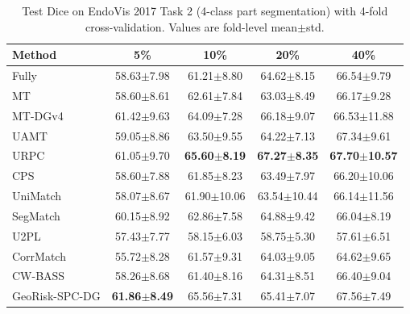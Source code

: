 \documentclass[journal]{IEEEtran}
\begin{document}
\begin{table}[t]
\caption{Test Dice on EndoVis 2017 Task 2 (4-class part segmentation) with 4-fold cross-validation. Values are fold-level mean$\pm$std.}
\label{tab:task2_results}
\centering
\scriptsize
\begin{tabular}{lcccc}
\toprule
Method & 5\% & 10\% & 20\% & 40\% \\
\midrule
Fully & 58.63{\tiny$\pm$7.98} & 61.21{\tiny$\pm$8.80} & 64.62{\tiny$\pm$8.15} & 66.54{\tiny$\pm$9.79} \\
MT \cite{tarvainen2017mean} & 58.60{\tiny$\pm$8.61} & 62.61{\tiny$\pm$7.84} & 63.03{\tiny$\pm$8.49} & 66.17{\tiny$\pm$9.28} \\
MT-DGv4 & 61.42{\tiny$\pm$9.63} & 64.09{\tiny$\pm$7.28} & 66.18{\tiny$\pm$9.07} & 66.53{\tiny$\pm$11.88} \\
UAMT \cite{yu2019uncertainty} & 59.05{\tiny$\pm$8.86} & 63.50{\tiny$\pm$9.55} & 64.22{\tiny$\pm$7.13} & 67.34{\tiny$\pm$9.61} \\
URPC \cite{chen2021urpc} & 61.05{\tiny$\pm$9.70} & \textbf{65.60{\tiny$\pm$8.19}} & \textbf{67.27{\tiny$\pm$8.35}} & \textbf{67.70{\tiny$\pm$10.57}} \\
CPS \cite{chen2021cps} & 58.60{\tiny$\pm$7.88} & 61.85{\tiny$\pm$8.23} & 63.49{\tiny$\pm$7.97} & 66.20{\tiny$\pm$10.06} \\
UniMatch \cite{yang2023unimatch} & 58.07{\tiny$\pm$8.67} & 61.90{\tiny$\pm$10.06} & 63.54{\tiny$\pm$10.44} & 66.14{\tiny$\pm$11.56} \\
SegMatch \cite{segmatch2025} & 60.15{\tiny$\pm$8.92} & 62.86{\tiny$\pm$7.58} & 64.88{\tiny$\pm$9.42} & 66.04{\tiny$\pm$8.19} \\
U2PL \cite{wang2022u2pl} & 57.43{\tiny$\pm$7.77} & 58.15{\tiny$\pm$6.03} & 58.75{\tiny$\pm$5.30} & 57.61{\tiny$\pm$6.51} \\
CorrMatch \cite{sun2024corrmatch} & 55.72{\tiny$\pm$8.28} & 61.57{\tiny$\pm$9.31} & 64.03{\tiny$\pm$9.05} & 64.62{\tiny$\pm$9.65} \\
CW-BASS \cite{cwbass2025} & 58.26{\tiny$\pm$8.68} & 61.40{\tiny$\pm$8.16} & 64.31{\tiny$\pm$8.51} & 66.40{\tiny$\pm$9.04} \\
\midrule
GeoRisk-SPC-DG & \textbf{61.86{\tiny$\pm$8.49}} & 65.56{\tiny$\pm$7.31} & 65.41{\tiny$\pm$7.07} & 67.56{\tiny$\pm$7.49} \\
\bottomrule
\end{tabular}
\end{table}
\end{document}
